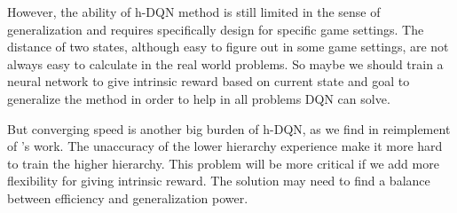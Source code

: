 \documentclass{article}
\newcommand{\Acknowledgement}[1]{\ \\{\bf Acknowledgement:} #1}
\begin{document}
\begin{spacing}{1.1}
    However, the ability of h-DQN method is still limited in the sense of generalization and requires specifically design for specific game settings. The distance of two states, although easy to figure out in some game settings, are not always easy to calculate in the real world problems. So maybe we should train a neural network to give intrinsic reward based on current state and goal to generalize the method in order to help in all problems DQN can solve.

    But converging speed is another big burden of h-DQN, as we find in reimplement of \cite{AI-16}'s work. The unaccuracy of the lower hierarchy experience make it more hard to train the higher hierarchy. This problem will be more critical if we add more flexibility for giving intrinsic reward. The solution may need to find a balance between efficiency and generalization power.
    
    



    \end{spacing}
    
\end{document}
